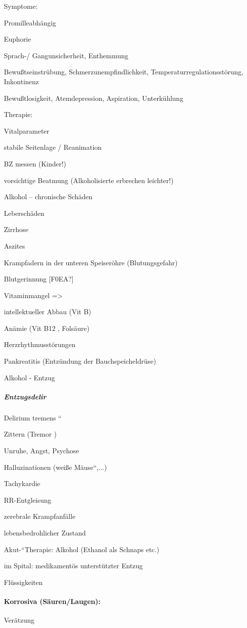 \documentclass{article}
\begin{document}
Symptome: 

Promilleabh\"angig

Euphorie

Sprach-/ Gangunsicherheit, Enthemmung

Bewu{\ss}tseinstr\"ubung,  Schmerzunempfindlichkeit, 
Temperaturregulationsst\"orung, Inkontinenz

Bewu{\ss}tlosigkeit, Atemdepression, Aspiration,  Unterk\"uhlung

Therapie:

Vitalparameter

stabile Seitenlage / Reanimation

BZ messen (Kinder!)

vorsichtige Beatmung (Alkoholisierte erbrechen  leichter!)

Alkohol -- chronische Sch\"aden

Lebersch\"aden

Zirrhose

Aszites

Krampfadern in der unteren Speiser\"ohre  (Blutungsgefahr)

Blutgerinnung [F0EA?]

Vitaminmangel ={\textgreater} 

intellektueller Abbau (Vit B)

An\"amie (Vit B12 , Fols\"aure)

Herzrhythmusst\"orungen

Pankreatitis (Entz\"undung der  Bauchspeicheldr\"use)

Alkohol - Entzug

\subparagraph{Entzugsdelir}
{\quotedblbase}Delirium tremens {\textquotedblleft}

Zittern (Tremor )

Unruhe, Angst, Psychose

Halluzinationen ({\quotedblbase}wei{\ss}e
M\"ause{\textquotedblleft},...)

Tachykardie

RR-Entgleisung

zerebrale Krampfanf\"alle

lebensbedrohlicher Zustand

{\quotedblbase}Akut-{\textquotedblleft}Therapie: Alkohol (Ethanol als
Schnaps  etc.)

im Spital: medikament\"os unterst\"utzter Entzug 

Fl\"ussigkeiten

\paragraph{Korrosiva (S\"auren/Laugen):}
Ver\"atzung
\end{document}

